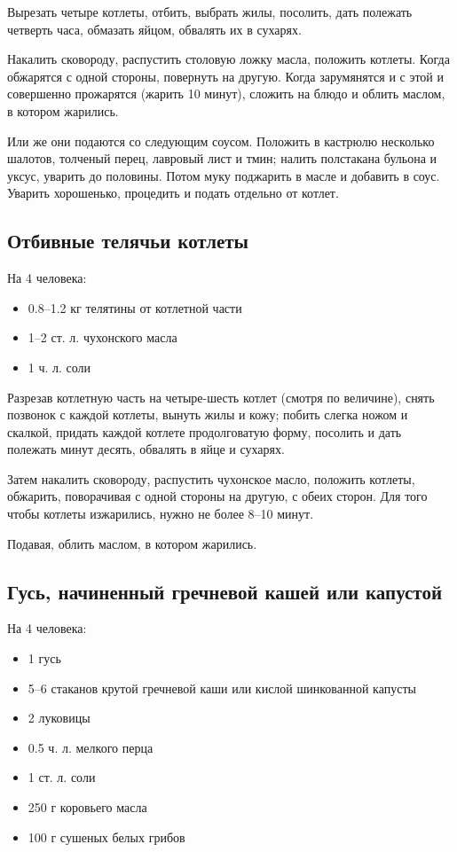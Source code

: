 Вырезать четыре котлеты, отбить, выбрать жилы, посолить, дать полежать четверть часа, обмазать яйцом, обвалять их в сухарях.

Накалить сковороду, распустить столовую ложку масла, положить котлеты. Когда обжарятся с одной стороны, повернуть на другую. Когда зарумянятся и с этой и совершенно прожарятся (жарить 10 минут), сложить на блюдо и облить маслом, в котором жарились.

Или же они подаются со следующим соусом. Положить в кастрюлю несколько шалотов, толченый перец, лавровый лист и тмин; налить полстакана бульона и уксус, уварить до половины. Потом муку поджарить в масле и добавить в соус. Уварить хорошенько, процедить и подать отдельно от котлет.

\subsection{Отбивные телячьи котлеты}

На 4 человека: 

\begin{itemize}
	\item 0.8–1.2 кг телятины от котлетной части 
    \item 1–2 ст. л. чухонского масла 
    \item 1 ч. л. соли
\end{itemize}

Разрезав котлетную часть на четыре-шесть котлет (смотря по величине), снять позвонок с каждой котлеты, вынуть жилы и кожу; побить слегка ножом и скалкой, придать каждой котлете продолговатую форму, посолить и дать полежать минут десять, обвалять в яйце и сухарях.

Затем накалить сковороду, распустить чухонское масло, положить котлеты, обжарить, поворачивая с одной стороны на другую, с обеих сторон. Для того чтобы котлеты изжарились, нужно не более 8–10 минут.

Подавая, облить маслом, в котором жарились.

\subsection{Гусь, начиненный гречневой кашей или капустой}\label{19gus-nachinennyj-grech}

На 4 человека:
\begin{itemize}
	\item  1 гусь 
    \item 5–6 стаканов крутой гречневой каши или кислой шинкованной капусты 
    \item 2 луковицы 
    \item 0.5 ч. л. мелкого перца 
    \item 1 ст. л. соли
    \item 250 г коровьего масла
    \item 100 г сушеных белых грибов
\end{itemize}

